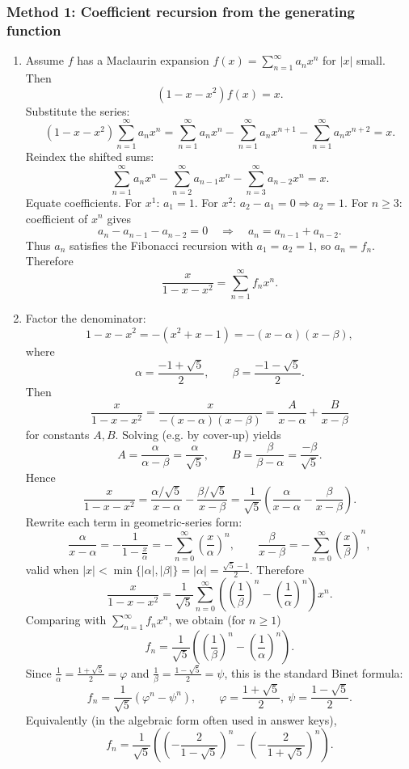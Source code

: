 \documentclass[12pt]{article}
\begin{document}
\subsubsection*{Method 1: Coefficient recursion from the generating function}
\begin{enumerate}[label=(\alph*)]
\item Assume \(f\) has a Maclaurin expansion \(f(x)=\sum_{n=1}^{\infty} a_n x^n\) for \(|x|\) small.
Then
\[
(1-x-x^2)f(x)=x.
\]
Substitute the series:
\[
(1-x-x^2)\sum_{n=1}^{\infty} a_n x^n
=\sum_{n=1}^{\infty} a_n x^n-\sum_{n=1}^{\infty} a_n x^{n+1}-\sum_{n=1}^{\infty} a_n x^{n+2}
=x.
\]
Reindex the shifted sums:
\[
\sum_{n=1}^{\infty} a_n x^n-\sum_{n=2}^{\infty} a_{n-1} x^{n}-\sum_{n=3}^{\infty} a_{n-2} x^{n}
=x.
\]
Equate coefficients. For \(x^1\): \(a_1=1\). For \(x^2\): \(a_2-a_1=0\Rightarrow a_2=1\).
For \(n\ge 3\): coefficient of \(x^n\) gives
\[
a_n-a_{n-1}-a_{n-2}=0 \quad\Longrightarrow\quad a_n=a_{n-1}+a_{n-2}.
\]
Thus \(a_n\) satisfies the Fibonacci recursion with \(a_1=a_2=1\), so \(a_n=f_n\).
Therefore
\[
\boxed{\frac{x}{1-x-x^2}=\sum_{n=1}^{\infty} f_n x^n.}
\]

\item Factor the denominator:
\[
1-x-x^2=-(x^2+x-1)=-(x-\alpha)(x-\beta),
\]
where
\[
\alpha=\frac{-1+\sqrt{5}}{2},\qquad \beta=\frac{-1-\sqrt{5}}{2}.
\]
Then
\[
\frac{x}{1-x-x^2}=\frac{x}{-(x-\alpha)(x-\beta)}=\frac{A}{x-\alpha}+\frac{B}{x-\beta}
\]
for constants \(A,B\). Solving (e.g. by cover-up) yields
\[
A=\frac{\alpha}{\alpha-\beta}=\frac{\alpha}{\sqrt{5}},\qquad
B=\frac{\beta}{\beta-\alpha}=\frac{-\beta}{\sqrt{5}}.
\]
Hence
\[
\frac{x}{1-x-x^2}
=\frac{\alpha/\sqrt{5}}{x-\alpha}-\frac{\beta/\sqrt{5}}{x-\beta}
=\frac{1}{\sqrt{5}}\left(\frac{\alpha}{x-\alpha}-\frac{\beta}{x-\beta}\right).
\]
Rewrite each term in geometric-series form:
\[
\frac{\alpha}{x-\alpha}=-\frac{1}{1-\frac{x}{\alpha}}
=-\sum_{n=0}^{\infty}\left(\frac{x}{\alpha}\right)^n,\qquad
\frac{\beta}{x-\beta}=-\sum_{n=0}^{\infty}\left(\frac{x}{\beta}\right)^n,
\]
valid when \(|x|<\min\{|\alpha|,|\beta|\}=|\alpha|=\frac{\sqrt{5}-1}{2}\).
Therefore
\[
\frac{x}{1-x-x^2}
=\frac{1}{\sqrt{5}}\sum_{n=0}^{\infty}\left(\left(\frac{1}{\beta}\right)^n-\left(\frac{1}{\alpha}\right)^n\right)x^n.
\]
Comparing with \(\sum_{n=1}^{\infty} f_n x^n\), we obtain (for \(n\ge 1\))
\[
f_n=\frac{1}{\sqrt{5}}\left(\left(\frac{1}{\beta}\right)^n-\left(\frac{1}{\alpha}\right)^n\right).
\]
Since \(\frac{1}{\alpha}=\frac{1+\sqrt{5}}{2}=\varphi\) and \(\frac{1}{\beta}=\frac{1-\sqrt{5}}{2}=\psi\), this is the standard Binet formula:
\[
\boxed{f_n=\frac{1}{\sqrt{5}}\left(\varphi^n-\psi^n\right),\qquad
\varphi=\frac{1+\sqrt{5}}{2},\ \psi=\frac{1-\sqrt{5}}{2}.}
\]
Equivalently (in the algebraic form often used in answer keys),
\[
\boxed{f_n=\frac{1}{\sqrt{5}}\left(\left(-\frac{2}{1-\sqrt{5}}\right)^n-\left(-\frac{2}{1+\sqrt{5}}\right)^n\right).}
\]
\end{enumerate}
\end{document}
